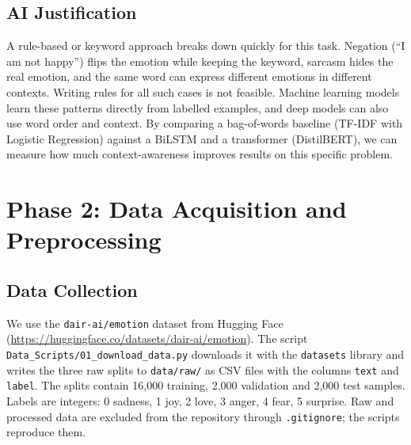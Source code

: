 \documentclass[12pt]{article}
\begin{document}
\subsection{AI Justification}
A rule-based or keyword approach breaks down quickly for this task. Negation (``I am not happy'') flips the emotion while keeping the keyword, sarcasm hides the real emotion, and the same word can express different emotions in different contexts. Writing rules for all such cases is not feasible. Machine learning models learn these patterns directly from labelled examples, and deep models can also use word order and context. By comparing a bag-of-words baseline (TF-IDF with Logistic Regression) against a BiLSTM and a transformer (DistilBERT), we can measure how much context-awareness improves results on this specific problem.

\section{Phase 2: Data Acquisition and Preprocessing}

\subsection{Data Collection}
We use the \texttt{dair-ai/emotion} dataset from Hugging Face (\url{https://huggingface.co/datasets/dair-ai/emotion}). The script \texttt{Data\_Scripts/01\_download\_data.py} downloads it with the \texttt{datasets} library and writes the three raw splits to \texttt{data/raw/} as CSV files with the columns \texttt{text} and \texttt{label}. The splits contain 16{,}000 training, 2{,}000 validation and 2{,}000 test samples. Labels are integers: 0 sadness, 1 joy, 2 love, 3 anger, 4 fear, 5 surprise. Raw and processed data are excluded from the repository through \texttt{.gitignore}; the scripts reproduce them.
\end{document}
